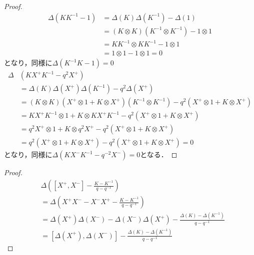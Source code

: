 \documentclass[10pt,dvipdfm]{beamer}
\begin{document}
  \begin{frame}
    \begin{proof}
      \begin{align*}
        \Delta(KK^{-1}-1) &= \Delta(K)\Delta(K^{-1}) - \Delta(1)\\
        &= (K\otimes K)(K^{-1}\otimes K^{-1}) - 1\otimes 1\\
        &= KK^{-1}\otimes KK^{-1} - 1\otimes 1\\
        &= 1\otimes 1 - 1\otimes 1 = 0
      \end{align*}
      となり，同様に$\Delta(K^{-1}K-1)=0$
      \begin{align*}
        \Delta&(KX^+K^{-1}-q^2X^+)\\ 
        &= \Delta(K)\Delta(X^+)\Delta(K^{-1}) - q^2\Delta(X^+)\\
        &= (K\otimes K)(X^+\otimes 1 + K\otimes X^+)(K^{-1}\otimes K^{-1}) - q^2(X^+\otimes 1 + K\otimes X^+)\\
        &= KX^+K^{-1}\otimes 1 + K\otimes KX^+K^{-1} - q^2(X^+\otimes 1 + K\otimes X^+)\\
        &= q^2X^+\otimes 1 + K\otimes q^2X^+ - q^2(X^+\otimes 1 + K\otimes X^+)\\
        &= q^2(X^+\otimes 1 + K\otimes X^+) - q^2(X^+\otimes 1 + K\otimes X^+) = 0
      \end{align*}
      となり，同様に$\Delta(KX^-K^{-1}-q^{-2}X^-)=0$となる．
      \let\qedsymbol\relax
    \end{proof}
  \end{frame}
  \begin{frame}
    \begin{proof}
      \begin{align*}
        &\Delta\left([X^+,X^-] - \frac{K-K^{-1}}{q-q^{-1}}\right) \\
        &= \Delta\left(X^+X^- - X^-X^+ - \frac{K-K^{-1}}{q-q^{-1}}\right)\\
        &= \Delta(X^+)\Delta(X^-) - \Delta(X^-)\Delta(X^+) - \frac{\Delta(K)-\Delta(K^{-1})}{q-q^{-1}}\\
        &= [\Delta(X^+),\Delta(X^-)] - \frac{\Delta(K) - \Delta(K^{-1})}{q-q^{-1}}
      \end{align*}
      \let\qedsymbol\relax
    \end{proof}
  \end{frame}
\end{document}
